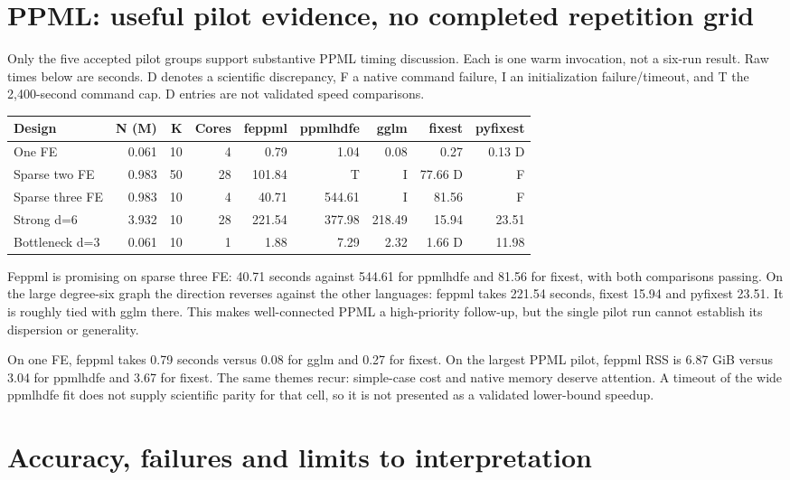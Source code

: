 \documentclass[11pt]{article}
\begin{document}
\clearpage\section{PPML: useful pilot evidence, no completed repetition grid}

Only the five accepted pilot groups support substantive PPML timing discussion. Each is one warm invocation, not a six-run result. Raw times below are seconds. D denotes a scientific discrepancy, F a native command failure, I an initialization failure/timeout, and T the 2,400-second command cap. D entries are not validated speed comparisons.

\small\begin{longtable}{lrrrrrrrr}
\toprule
Design & N (M) & K & Cores & feppml & ppmlhdfe & gglm & fixest & pyfixest\\\midrule\endhead
One FE & 0.061 & 10 & 4 & 0.79 & 1.04 & 0.08 & 0.27 & 0.13 D\\
Sparse two FE & 0.983 & 50 & 28 & 101.84 & T & I & 77.66 D & F\\
Sparse three FE & 0.983 & 10 & 4 & 40.71 & 544.61 & I & 81.56 & F\\
Strong d=6 & 3.932 & 10 & 28 & 221.54 & 377.98 & 218.49 & 15.94 & 23.51\\
Bottleneck d=3 & 0.061 & 10 & 1 & 1.88 & 7.29 & 2.32 & 1.66 D & 11.98\\
\bottomrule\end{longtable}\normalsize

Feppml is promising on sparse three FE: 40.71 seconds against 544.61 for ppmlhdfe and 81.56 for fixest, with both comparisons passing. On the large degree-six graph the direction reverses against the other languages: feppml takes 221.54 seconds, fixest 15.94 and pyfixest 23.51. It is roughly tied with gglm there. This makes well-connected PPML a high-priority follow-up, but the single pilot run cannot establish its dispersion or generality.

On one FE, feppml takes 0.79 seconds versus 0.08 for gglm and 0.27 for fixest. On the largest PPML pilot, feppml RSS is 6.87 GiB versus 3.04 for ppmlhdfe and 3.67 for fixest. The same themes recur: simple-case cost and native memory deserve attention. A timeout of the wide ppmlhdfe fit does not supply scientific parity for that cell, so it is not presented as a validated lower-bound speedup.

\clearpage\section{Accuracy, failures and limits to interpretation}
\end{document}
